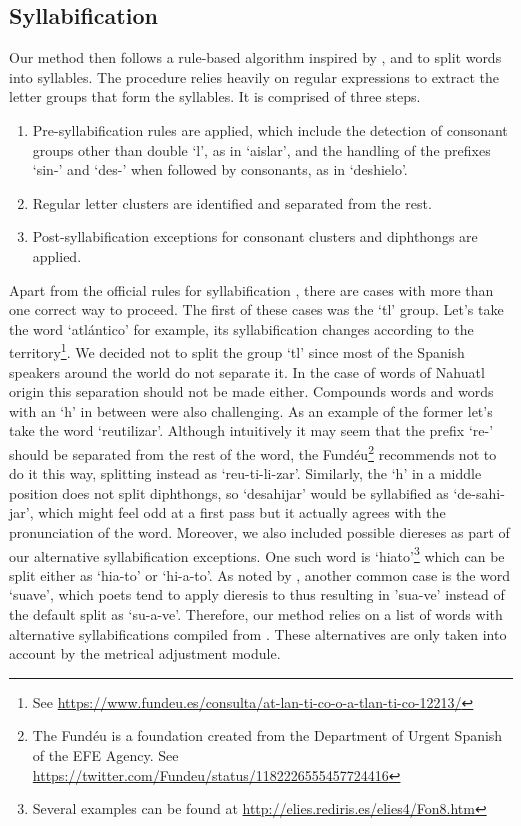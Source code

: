 \documentclass[a4paper,11pt,twocolumn,twoside]{article}
\begin{document}
\subsection{Syllabification}
Our method then follows a rule-based algorithm inspired by ,  and  to split words into syllables. The procedure relies heavily on regular expressions to extract the letter groups that form the syllables. It is comprised of three steps.
\begin{enumerate}
\item Pre-syllabification rules are applied, which include the detection of consonant groups other than double `l', as in `aislar', and the handling of the prefixes `sin-' and `des-' when followed by consonants, as in `deshielo'.
\item Regular letter clusters are identified and separated from the rest.
\item Post-syllabification exceptions for consonant clusters and diphthongs are applied.
\end{enumerate}
Apart from the official rules for syllabification \cite{espanola2010ortografia}, there are cases with more than one correct way to proceed. The first of these cases was the `tl' group. Let's take the word `atlántico' for example, its syllabification changes according to the territory\footnote{See \url{https://www.fundeu.es/consulta/at-lan-ti-co-o-a-tlan-ti-co-12213/}}. We decided not to split the group `tl' since most of the Spanish speakers around the world do not separate it. In the case of words of Nahuatl origin this separation should not be made either.
Compounds words and words with an `h' in between were also challenging. As an example of the former let's take the word `reutilizar'. Although intuitively it may seem that the prefix `re-' should be separated from the rest of the word, the Fundéu\footnote{The Fundéu is a foundation created from the Department of Urgent Spanish of the EFE Agency. See \url{https://twitter.com/Fundeu/status/1182226555457724416}} recommends not to do it this way, splitting instead as `reu-ti-li-zar'. Similarly, the `h' in a middle position does not split diphthongs, so `desahijar' would be syllabified as `de-sahi-jar', which might feel odd at a first pass but it actually agrees with the pronunciation of the word.
Moreover, we also included possible diereses as part of our alternative syllabification exceptions. One such word is `hiato'\footnote{Several examples can be found at \url{http://elies.rediris.es/elies4/Fon8.htm}} which can be split either as `hia-to' or `hi-a-to'. As noted by , another common case is the word `suave', which poets tend to apply dieresis to thus resulting in 'sua-ve' instead of the default split as `su-a-ve'.  Therefore, our method relies on a list of words with alternative syllabifications compiled from . These alternatives are only taken into account by the metrical adjustment module.
\end{document}
